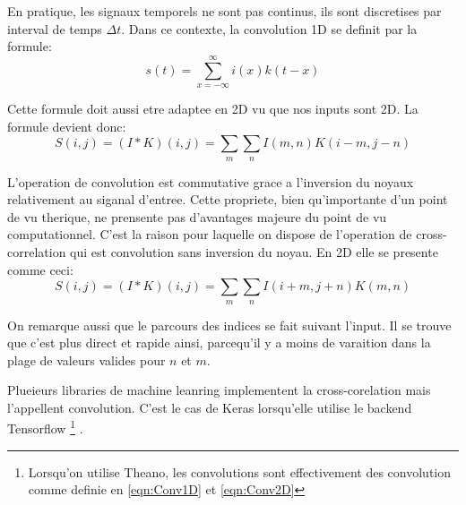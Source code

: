 En pratique, les signaux temporels ne sont pas continus, ils sont discretises par interval de temps $\Delta t$. Dans ce contexte, la convolution 1D se definit par la formule:
\begin{equation}
 s(t) = \sum_{x=-\infty}^{\infty} i(x)k(t-x)
 \label{eqn:Conv1D}
\end{equation}

Cette formule doit aussi etre adaptee en 2D vu que nos inputs sont 2D. La formule devient donc:
\begin{equation}
 S(i,j) = (I * K)(i,j) = \sum_{m}\sum_{n} I(m,n)K(i-m,j-n)
 \label{eqn:Conv2D}
\end{equation}

L'operation de convolution est commutative grace a l'inversion du noyaux relativement au siganal d'entree. Cette propriete, bien qu'importante d'un point de vu therique, ne prensente pas d'avantages majeure du point de vu computationnel. C'est la raison pour laquelle on dispose de l'operation de cross-correlation qui est convolution sans inversion du noyau. En 2D elle se presente comme ceci:
\begin{equation}
 S(i,j) = (I * K)(i,j) = \sum_{m}\sum_{n} I(i+m,j+n)K(m,n)
 \label{eqn:Corr2D}
\end{equation}

On remarque aussi que le parcours des indices se fait suivant l'input. Il se trouve que c'est plus direct et rapide ainsi, parcequ'il y a moins de varaition dans la plage de valeurs valides pour $n$ et $m$. 

Plueieurs libraries de machine leanring implementent la cross-corelation mais l'appellent convolution. C'est le cas de Keras lorsqu'elle utilise le backend Tensorflow \footnote{Lorsqu'on utilise Theano, les convolutions sont effectivement des convolution comme definie en \ref{eqn:Conv1D} et \ref{eqn:Conv2D}} \parencite{Reference6}.
% 
% 


